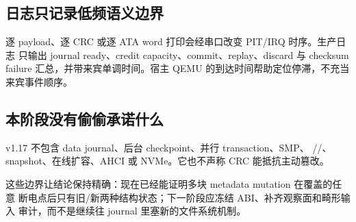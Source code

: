 \subsection{日志只记录低频语义边界}

逐 payload、逐 CRC 或逐 ATA word 打印会经串口改变 PIT/IRQ 时序。生产日志
只输出 journal ready、credit capacity、commit、replay、discard 与 checksum
failure 汇总，并带来宾单调时间。宿主 QEMU 的到达时间帮助定位停滞，不充当
来宾事件顺序。

\subsection{本阶段没有偷偷承诺什么}

v1.17 不包含 data journal、后台 checkpoint、并行 transaction、SMP、
//、snapshot、在线扩容、AHCI 或
NVMe。它也不声称 CRC 能抵抗主动篡改。

这些边界让结论保持精确：现在已经能证明多块 metadata mutation 在覆盖的任意
断电点后只有旧/新两种结构状态；下一阶段应冻结 ABI、补齐观察面和畸形输入
审计，而不是继续往 journal 里塞新的文件系统机制。
